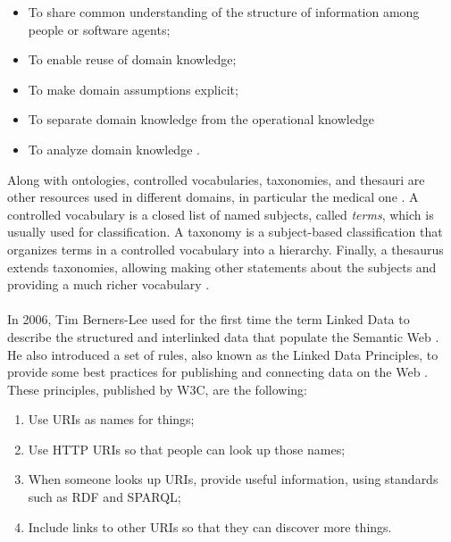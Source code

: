 \begin{itemize}
    \item To share common understanding of the structure of information among people or software agents;
    \item To enable reuse of domain knowledge;
    \item To make domain assumptions explicit;
    \item To separate domain knowledge from the operational knowledge
    \item To analyze domain knowledge \cite{noy2001ontology}.
\end{itemize}

Along with ontologies, controlled vocabularies, taxonomies, and thesauri are other resources used in different domains, in particular the medical one \cite{ivanovic2014overview}. A controlled vocabulary is a closed list of named subjects, called \textit{terms}, which is usually used for classification. A taxonomy is a subject-based classification that organizes terms in a controlled vocabulary into a hierarchy. Finally, a thesaurus extends taxonomies, allowing making other statements about the subjects and providing a much richer vocabulary \cite{ivanovic2014overview}.

\paragraph*{}
In 2006, Tim Berners-Lee used for the first time the term Linked Data to describe the structured and interlinked data that populate the Semantic Web \cite{berners2006linked}. He also introduced a set of rules, also known as the Linked Data Principles, to provide some best practices for publishing and connecting data on the Web \cite{bizer2011linked}. These principles, published by \ac{W3C}, are the following:

\begin{enumerate}
    \item Use \acsp{URI} as names for things;
    \item Use \acs{HTTP} \acsp{URI} so that people can look up those names;
    \item When someone looks up \acsp{URI}, provide useful information, using standards such as \acs{RDF} and \acs{SPARQL};
    \item Include links to other \acsp{URI} so that they can discover more things.
\end{enumerate}


